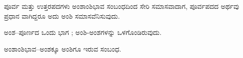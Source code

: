 \begin{kbvrule}
\hspace{0.5em}ಪೂರ್ವ ಮತ್ತು ಉತ್ತರಪದಗಳು ಅಂಶಾಂಶಿಭಾವ ಸಂಬಂಧದಿಂದ ಸೇರಿ ಸಮಾಸವಾದಾಗ, ಪೂರ್ವಪದದ ಅರ್ಥವು ಪ್ರಧಾನ ವಾಗಿದ್ದರೂ ಅದು ಅಂಶಿ ಸಮಾಸವೆನಿಸುವುದು.
\end{kbvrule}

\indent ಅಂಶ--ಪೂರ್ಣದ ಒಂದು ಭಾಗ ; ಅಂಶಿ-ಅಂಶಗಳನ್ನು ಒಳಗೊಂಡಿರುವುದು.\par

\noindent\hspace*{2.2em}ಅಂಶಾಂಶಿಭಾವ--ಅಂಶಕ್ಕೂ ಅಂಶಿಗೂ ಇರುವ ಸಂಬಂಧ.\par
